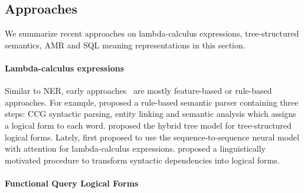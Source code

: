 
\subsection{Approaches}
We summarize recent approaches on lambda-calculus expressions, tree-structured semantics, AMR and SQL meaning representations in this section. 
\paragraph{Lambda-calculus expressions}
Similar to NER, early approaches~\cite{cai2013large,poon2013grounded,berant2014semantic,krishnamurthy2016probabilistic,krishnamurthy2017neural} are mostly feature-based or rule-based approaches. 
For example, \citet{krishnamurthy2015learning} proposed a rule-based semantic parser containing three steps: CCG syntactic parsing, entity linking and semantic analysis which assigns a logical form to each word. 
\citet{lu2011probabilistic,lu2014semantic} proposed the hybrid tree model for tree-structured logical forms. 
Lately, \citet{dong2016language} first proposed to use the sequence-to-sequence neural model with attention for lambda-calculus expressions. 
\citet{reddy2016transforming,reddy2017universal} proposed a linguistically motivated procedure to transform syntactic dependencies into logical forms. 

\paragraph{Functional Query Logical Forms}

